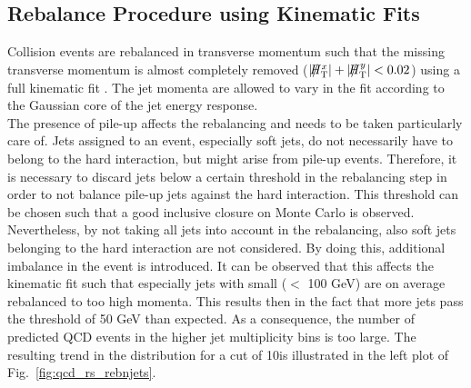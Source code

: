 \subsection{Rebalance Procedure using Kinematic Fits}
\label{subsec:RA2_reb}
Collision events are rebalanced in transverse momentum such that the missing transverse momentum is almost completely removed ($|\slash\mkern-12mu{H}_{\text{T}}^x| + |\slash\mkern-12mu{H}_{\text{T}}^y| < 0.02$) using a full kinematic fit . The jet momenta are allowed to vary in the fit according to the Gaussian core of the jet energy response. \\
The presence of pile-up affects the rebalancing and needs to be taken particularly care of. Jets assigned to an event, especially soft jets, do not necessarily have to belong to the hard interaction, but might arise from pile-up events. Therefore, it is necessary to discard jets below a certain \pt threshold in the rebalancing step in order to not balance pile-up jets against the hard interaction. This \pt threshold can be chosen such that a good inclusive closure on Monte Carlo is observed. Nevertheless, by not taking all jets into account in the rebalancing, also soft jets belonging to the hard interaction are not considered. By doing this, additional imbalance in the event is introduced. It can be observed that this affects the kinematic fit such that especially jets with small \pt ($<$ 100 GeV) are on average rebalanced to too high momenta. This results then in the fact that more jets pass the threshold of 50 GeV than expected. As a consequence, the number of predicted QCD events in the higher jet multiplicity bins is too large. The resulting trend in the \NJets distribution for a \pt cut of 10\gev is illustrated in the left plot of Fig.~\ref{fig:qcd_rs_rebnjets}.\\

